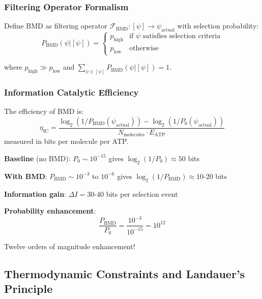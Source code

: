 \documentclass[11pt,onecolumn]{article}
\begin{document}
\subsubsection{Filtering Operator Formalism}

Define BMD as filtering operator $\mathcal{F}_{\text{BMD}}: [\psi] \to \psi_{\text{actual}}$ with selection probability:
\begin{equation}
P_{\text{BMD}}(\psi | [\psi]) = \begin{cases}
p_{\text{high}} & \text{if } \psi \text{ satisfies selection criteria} \\
p_{\text{low}} & \text{otherwise}
\end{cases}
\end{equation}

where $p_{\text{high}} \gg p_{\text{low}}$ and $\sum_{\psi \in [\psi]} P_{\text{BMD}}(\psi | [\psi]) = 1$.

\subsubsection{Information Catalytic Efficiency}

\begin{definition}
The efficiency of BMD is:
\begin{equation}
\eta_{\text{IC}} = \frac{\log_2(1/P_{\text{BMD}}(\psi_{\text{actual}})) - \log_2(1/P_0(\psi_{\text{actual}}))}{N_{\text{molecules}} \cdot E_{\text{ATP}}}
\end{equation}
measured in bits per molecule per ATP.
\end{definition}

\textbf{Baseline} (no BMD): $P_0 \sim 10^{-15}$ gives $\log_2(1/P_0) \approx 50$ bits

\textbf{With BMD}: $P_{\text{BMD}} \sim 10^{-3}$ to $10^{-6}$ gives $\log_2(1/P_{\text{BMD}}) \approx 10$-20 bits

\textbf{Information gain}: $\Delta I = 30$-40 bits per selection event

\textbf{Probability enhancement}:
\begin{equation}
\frac{P_{\text{BMD}}}{P_0} = \frac{10^{-3}}{10^{-15}} = 10^{12}
\end{equation}

Twelve orders of magnitude enhancement!

\subsection{Thermodynamic Constraints and Landauer's Principle}
\end{document}
